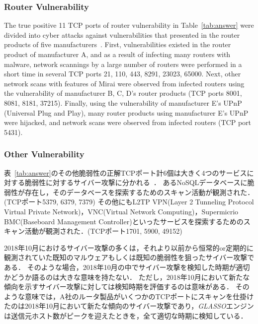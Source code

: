\documentclass[conference]{IEEEtran}
\begin{document}
\subsubsection{Router Vulnerability}
The true positive 11 TCP ports of router vulnerability in Table~\ref{tab:answer} were divided into cyber attacks against vulnerabilities that presented in the router products of five manufacturers~\cite{Huawei,Netlab_BCM,Netlab_MikroTik}.
First, vulnerabilities existed in the router product of manufacturer A, and as a result of infecting many routers with malware, network scannings by a large number of routers were performed in a short time in several TCP ports 21, 110, 443, 8291, 23023, 65000.
Next, other network scans with features of Mirai were observed from infected routers using the vulnerability of manufacturer B, C, D's router products (TCP ports 8001, 8081, 8181, 37215).
Finally, using the vulnerability of manufacturer E's UPnP (Universal Plug and Play), many router products using manufacturer E's UPnP were hijacked, and network scans were observed from infected routers (TCP port 5431).



\subsubsection{Other Vulnerability}
表~\ref{tab:answer}のその他脆弱性の正解TCPポート計6個は大きく4つのサービスに対する脆弱性に対するサイバー攻撃に分かれる~\cite{Imperva}．
あるNoSQLデータベースに脆弱性が存在し，そのデータベースを探索するためのスキャン活動が観測された．(TCPポート5379, 6379, 7379)
その他にもL2TP VPN(Layer 2 Tunneling Protocol Virtual Private Network)，VNC(Virtual Network Computing)，Supermicrio BMC(Baseboard Management Controller)といったサービスを探索するためのスキャン活動が観測された．(TCPポート1701, 5900, 49152)


2018年10月におけるサイバー攻撃の多くは，それより以前から恒常的or定期的に観測されていた既知のマルウェアもしくは既知の脆弱性を狙ったサイバー攻撃である．
そのような場合，2018年10月の中でサイバー攻撃を検知した時期が適切かどうか語るのは大きな意味を持たない．
ただし，2018年10月において新たな傾向を示すサイバー攻撃に対しては検知時期を評価するのは意味がある．
そのような意味では，A社のルータ製品がいくつかのTCPポートにスキャンを仕掛けたのは2018年10月において新たな傾向のサイバー攻撃であり，{\it GLASSO}エンジンは送信元ホスト数がピークを迎えたときを，全て適切な時期に検知している．



\end{document}
